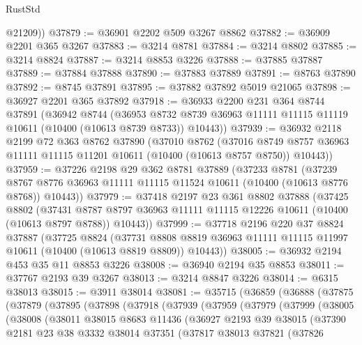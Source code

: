 \begin{lexlean}{RustStd}
\begin{coremodule}
        @21209))
@37879 := @36901 @2202 @509 @3267 @8862
@37882 := @36909 @2201 @365 @3267
@37883 := @3214 @8781
@37884 := @3214 @8802
@37885 := @3214 @8824
@37887 := @3214 @8853 @3226
@37888 := @37885 @37887
@37889 := @37884 @37888
@37890 := @37883 @37889
@37891 := @8763 @37890
@37892 := @8745 @37891
@37895 := @37882 @37892 @5019 @21065
@37898 := @36927 @2201 @365 @37892
@37918 := @36933
    @2200
    @231
    @364
    @8744
    @37891
    (@36942
      @8744
      (@36953 @8732 @8739 @36963 @11111 @11115 @11119 @10611 (@10400 (@10613 @8739 @8733)) @10443))
@37939 := @36932
    @2118
    @2199
    @72
    @363
    @8762
    @37890
    (@37010
      @8762
      (@37016 @8749 @8757 @36963 @11111 @11115 @11201 @10611 (@10400 (@10613 @8757 @8750)) @10443))
@37959 := @37226
    @2198
    @29
    @362
    @8781
    @37889
    (@37233
      @8781
      (@37239 @8767 @8776 @36963 @11111 @11115 @11524 @10611 (@10400 (@10613 @8776 @8768)) @10443))
@37979 := @37418
    @2197
    @23
    @361
    @8802
    @37888
    (@37425
      @8802
      (@37431 @8787 @8797 @36963 @11111 @11115 @12226 @10611 (@10400 (@10613 @8797 @8788)) @10443))
@37999 := @37718
    @2196
    @220
    @37
    @8824
    @37887
    (@37725
      @8824
      (@37731 @8808 @8819 @36963 @11111 @11115 @11997 @10611 (@10400 (@10613 @8819 @8809)) @10443))
@38005 := @36932 @2194 @453 @35 @11 @8853 @3226
@38008 := @36940 @2194 @35 @8853
@38011 := @37767 @2193 @39 @3267
@38013 := @3214 @8847 @3226
@38014 := @6315 @38013
@38015 := @3911 @38014
@38081 := @35715
    (@36859
      (@36888
        (@37875
          (@37879
            (@37895
              (@37898
                (@37918
                  (@37939
                    (@37959
                      (@37979
                        (@37999
                          (@38005
                            (@38008
                              (@38011
                                @38015
                                @8683
                                @11436
                                (@36927
                                  @2193
                                  @39
                                  @38015
                                  (@37390
                                    @2181
                                    @23
                                    @38
                                    @3332
                                    @38014
                                    @37351
                                    (@37817
                                      @38013
                                      @37821
                                      (@37826

\end{coremodule}
\end{lexlean}
